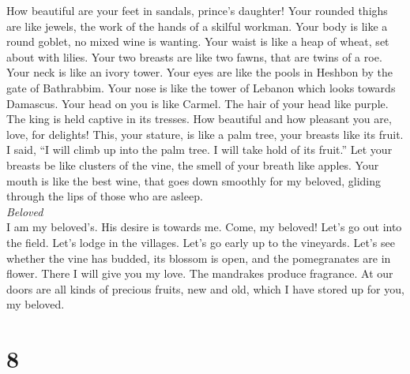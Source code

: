  How beautiful are your feet in sandals, prince's
daughter! Your rounded thighs are like jewels, the work of the hands of
a skilful workman.  Your body is like a round goblet, no
mixed wine is wanting. Your waist is like a heap of wheat, set about
with lilies.  Your two breasts are like two fawns, that
are twins of a roe.  Your neck is like an ivory tower.
Your eyes are like the pools in Heshbon by the gate of Bathrabbim. Your
nose is like the tower of Lebanon which looks towards Damascus.
 Your head on you is like Carmel. The hair of your head
like purple. The king is held captive in its tresses.  How
beautiful and how pleasant you are, love, for delights! 
This, your stature, is like a palm tree, your breasts like its fruit.
 I said, ``I will climb up into the palm tree. I will take
hold of its fruit.'' Let your breasts be like clusters of the vine, the
smell of your breath like apples.  Your mouth is like the
best wine, that goes down smoothly for my beloved, gliding through the
lips of those who are asleep.\\
\emph{Beloved}\\
 I am my beloved's. His desire is towards me.
 Come, my beloved! Let's go out into the field. Let's
lodge in the villages.  Let's go early up to the
vineyards. Let's see whether the vine has budded, its blossom is open,
and the pomegranates are in flower. There I will give you my love.
 The mandrakes produce fragrance. At our doors are all
kinds of precious fruits, new and old, which I have stored up for you,
my beloved.

\hypertarget{section-7}{%
\section{8}\label{section-7}}

